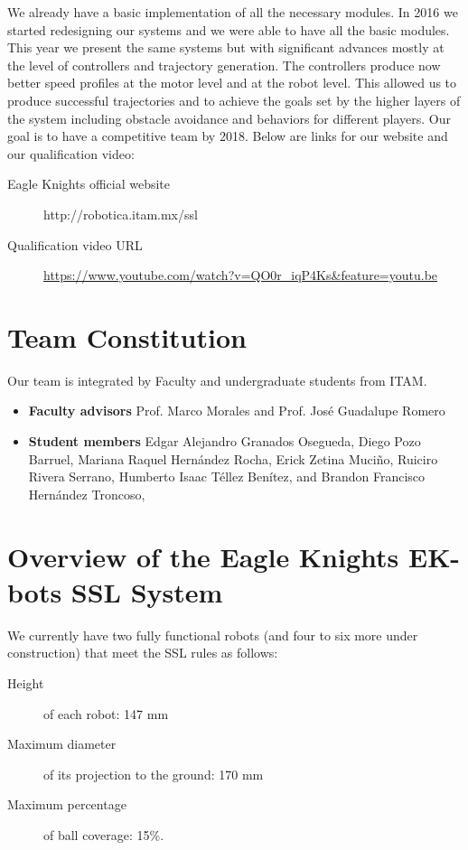 \documentclass[]{llncs}
\newcommand{\TODO}[1]{{\textcolor{blue}{ToDo: {#1}}}}
\begin{document}
We already have a basic implementation of all the necessary modules. In 2016 we started redesigning our systems and we were able to have all the basic modules. This year we present the same systems but with significant advances mostly at the level of controllers and trajectory generation. The controllers produce now better speed profiles at the motor level and at the robot level. This allowed us to produce successful trajectories and to achieve the goals set by the higher layers of the system including obstacle avoidance and behaviors for different players. Our goal is to have a competitive team by 2018. Below are links for our website and our qualification video:
\begin{description}
	\item[Eagle Knights official website] http://robotica.itam.mx/ssl
	\item[Qualification video URL] \url{https://www.youtube.com/watch?v=QO0r\_iqP4Ks\&feature=youtu.be} %
\end{description}


\section{Team Constitution}

Our team is integrated by Faculty and undergraduate students from ITAM.
\begin{itemize}
\item {\bf Faculty advisors} 
Prof. Marco Morales and
Prof. José Guadalupe Romero
\item {\bf Student members} 
Edgar Alejandro Granados Osegueda,
Diego Pozo Barruel,
Mariana Raquel Hernández Rocha,
Erick Zetina Muciño,
Ruiciro Rivera Serrano,
Humberto Isaac Téllez Benítez, and
Brandon Francisco Hernández Troncoso,
\end{itemize}


\section{Overview of the Eagle Knights EK-bots SSL System }

We currently have two fully functional robots (and four to six more under construction) that meet the SSL rules as follows:
\begin{description} 
	\item [Height] of each robot: 147 mm
	\item [Maximum diameter] of its projection to the ground: 170 mm
	\item [Maximum percentage] of ball coverage: 15\%. 
\end{description}
\end{document}
